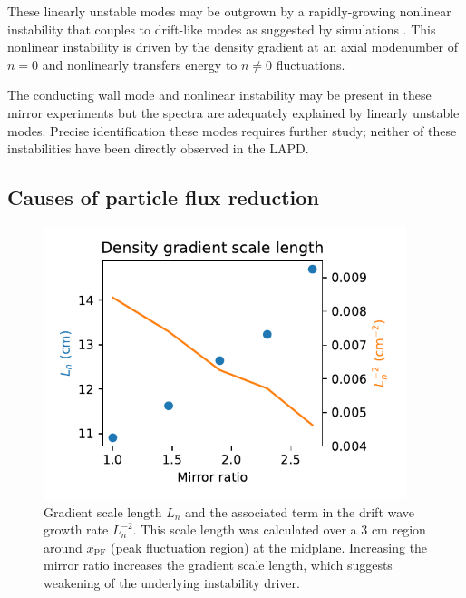 These linearly unstable modes may be outgrown by a rapidly-growing nonlinear instability that couples to drift-like modes as suggested by simulations \cite{Friedman_2013}. This nonlinear instability is driven by the density gradient at an axial modenumber of $n=0$ and nonlinearly transfers energy to $n \neq 0$ fluctuations. 

The conducting wall mode and nonlinear instability may be present in these mirror experiments but the spectra are adequately explained by linearly unstable modes. Precise identification these modes requires further study; neither of these instabilities have been directly observed in the LAPD.

\subsection{Causes of particle flux reduction}

\begin{figure}
    \centering
    \includegraphics[width=300pt]{figures/fig19.pdf}
    \caption{Gradient scale length $L_n$ and the associated term in the drift wave growth rate $L_n^{-2}$. This scale length was calculated over a 3 cm region around $x_\text{PF}$ (peak fluctuation region) at the midplane. Increasing the mirror ratio increases the gradient scale length, which suggests weakening of the underlying instability driver.}
    \label{fig:L_n}
\end{figure}

